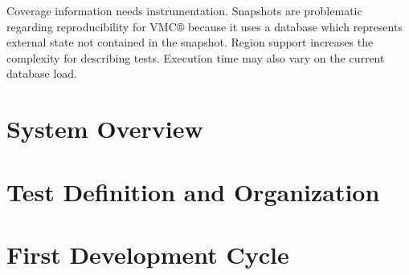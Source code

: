 \documentclass[a4paper,twocolumn]{article}
\newcommand{\VMC}[0]{VMC®}
\begin{document}
Coverage information needs instrumentation.
Snapshots are problematic regarding reproducibility for \VMC{} because it uses a database which represents external state not contained in the snapshot.
Region support increases the complexity for describing tests.
Execution time may also vary on the current database load.

\section{System Overview}

\section{Test Definition and Organization}

\section{First Development Cycle}



\printbibliography[notkeyword=software]
\printbibliography[keyword=software,title={Used software}]
\end{document}
